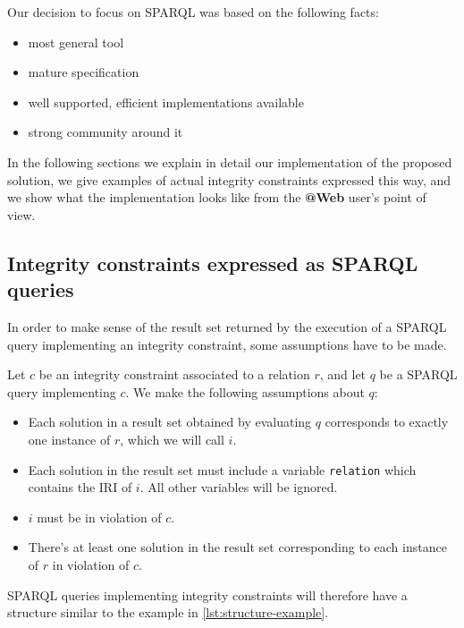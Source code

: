 \documentclass[a4paper, 10pt]{article}
\makeatletter
\newcommand{\atweb}{\textbf{@Web}\xspace}
\newcommand{\code}[1]{\texttt{#1}}
\makeatother
\begin{document}
Our decision to focus on SPARQL was based on the following facts:

\begin{itemize}
  \item {} most general tool
  \item mature specification
  \item well supported, efficient implementations available
  \item strong community around it
\end{itemize}

In the following sections we explain in detail our implementation of the
proposed solution, we give examples of actual integrity constraints expressed
this way, and we show what the implementation looks like from the \atweb user's
point of view.


\subsection{Integrity constraints expressed as SPARQL queries}
\label{sec:integrity-constraints-as-sparql}

In order to make sense of the result set returned by the execution of a SPARQL
query implementing an integrity constraint, some assumptions have to be made.

 Let $c$ be an integrity constraint
associated to a relation $r$, and let $q$ be a SPARQL query implementing $c$.
We make the following assumptions about $q$:

\begin{itemize}
  \item Each solution in a result set obtained by evaluating $q$ corresponds to
    exactly one instance of $r$, which we will call $i$.

  \item Each solution in the result set must include a variable
    \code{relation} which contains the IRI of $i$. All other variables will
    be ignored.

  \item $i$ must be in violation of $c$.

  \item There's at least one solution in the result set corresponding to each
    instance of $r$ in violation of $c$.
\end{itemize}

SPARQL queries implementing integrity constraints will therefore have a
structure similar to the example in \autoref{lst:structure-example}.
\end{document}

